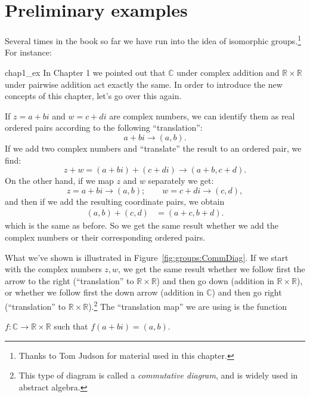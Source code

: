 
\section{Preliminary examples}\label{isomorph_defn_ex}

Several times in the book so far we have run into the idea of isomorphic groups.\footnote{Thanks to Tom Judson for material used in this chapter.}  For instance:

\begin{example}{chap1_ex}
In Chapter 1 we pointed out that ${\mathbb C}$ under complex addition and ${\mathbb R} \times {\mathbb R}$ under pairwise addition act exactly the same. In order to introduce the new concepts of this chapter, let's go over this again. 

If $z = a+bi$ and $w = c+di$ are complex numbers, we can identify  them as real ordered pairs according to the following ``translation'':
\[ a+bi \longrightarrow (a,b). \]
If we add two complex numbers and ``translate'' the result to an ordered pair, we find:
\[
z + w = (a + bi) + (c + di)  \longrightarrow (a+b,c+d).
\]
On the other hand, if we map $z$ and $w$ separately we get:
\[
z = a + bi  \longrightarrow (a,b);\qquad w = c+di  \longrightarrow (c,d),
\]
and then if we add the resulting  coordinate pairs, we obtain
\begin{align*}
(a,b) +  (c,d) 
&= (a+c,b+d). 
\end{align*}
which is the same as before. So we get the same result whether we add the complex numbers or their corresponding ordered pairs.  

What we've shown  is illustrated in Figure~\ref{fig:groups:CommDiag}. If we start with the complex numbers $z,w$, we get the same result whether we follow first the arrow to the right (``translation'' to ${\mathbb R} \times {\mathbb R}$) and then go down (addition in ${\mathbb R} \times {\mathbb R}$), or whether we follow first the down arrow (addition in ${\mathbb C}$) and then go right (``translation'' to ${\mathbb R} \times {\mathbb R}$).\footnote{This type of diagram is called a \emph{commutative diagram}, and is widely used in abstract algebra.} The ``translation map'' we are using is the function 
\begin{center}
$f : {\mathbb C} \longrightarrow {\mathbb R} \times {\mathbb R}$ such that $f(a + bi) = (a,b)$.
\end{center}


\end{example}
